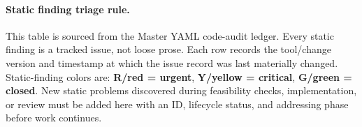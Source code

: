 \paragraph{Static finding triage rule.} This table is sourced from the Master YAML code-audit ledger. Every static finding is a tracked issue, not loose prose. Each row records the tool/change version and timestamp at which the issue record was last materially changed. Static-finding colors are: \textbf{R/red = urgent}, \textbf{Y/yellow = critical}, \textbf{G/green = closed}. New static problems discovered during feasibility checks, implementation, or review must be added here with an ID, lifecycle status, and addressing phase before work continues.

